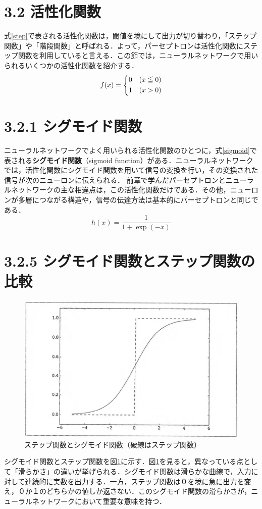 \documentclass[dvipdfmx]{jsarticle}
\begin{document}
\section*{3.2 活性化関数}
式\ref{step}で表される活性化関数は，閾値を境にして出力が切り替わり，「ステップ関数」や「階段関数」と呼ばれる．よって，パーセプトロンは活性化関数にステップ関数を利用していると言える．この節では，ニューラルネットワークで用いられるいくつかの活性化関数を紹介する．
\begin{equation}\label{step}
    f(x)=
    \begin{dcases}
      0 & (x \leqq 0) \\
      1 & (x > 0)
    \end{dcases}
  \end{equation}


\section*{3.2.1 シグモイド関数}
ニューラルネットワークでよく用いられる活性化関数のひとつに，式\ref{sigmoid}で表される\textbf{シグモイド関数}（sigmoid function）がある．ニューラルネットワークでは，活性化関数にシグモイド関数を用いて信号の変換を行い，その変換された信号が次のニューロンに伝えられる．
前章で学んだパーセプトロンとニューラルネットワークの主な相違点は，この活性化関数だけである．その他，ニューロンが多層につながる構造や，信号の伝達方法は基本的にパーセプトロンと同じである．
\begin{equation}\label{sigmoid}
h(x)=\frac{1}{1 + \exp(-x)}
\end{equation}


\section*{3.2.5 シグモイド関数とステップ関数の比較}
\begin{figure}[H]\label{step_sigmoid}
\begin{center}
\includegraphics[width=0.8\linewidth]{"./spring_lec/dp_active_function.png"}
\end{center}
\caption{ステップ関数とシグモイド関数（破線はステップ関数）}
\end{figure}
シグモイド関数とステップ関数を図\ref{step_sigmoid}に示す．図\ref{step_sigmoid}を見ると，異なっている点として「滑らかさ」の違いが挙げられる．シグモイド関数は滑らかな曲線で，入力に対して連続的に実数を出力する．一方，ステップ関数は０を境に急に出力を変え，０か１のどちらかの値しか返さない．このシグモイド関数の滑らかさが，ニューラルネットワークにおいて重要な意味を持つ．
\end{document}
